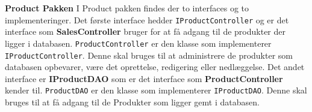 \textbf{Product Pakken}\newline
I Product pakken findes der to interfaces og to implementeringer.\newline
Det første interface hedder \texttt{IProductController} og er det interface som \textbf{SalesController} bruger for at få adgang til de produkter der ligger i databasen. \newline
\texttt{ProductController} er den klasse som implementerer \texttt{IProductController}. Denne skal bruges til at administrere de produkter som databasen opbevarer, være det oprettelse, redigering eller nedlæggelse.
Det andet interface er \textbf{IProductDAO} som er det interface som \textbf{ProductController} kender til. 
\texttt{ProductDAO} er den klasse som implementerer \texttt{IProductDAO}. Denne skal bruges til at få adgang til de Produkter som ligger gemt i databasen.    

